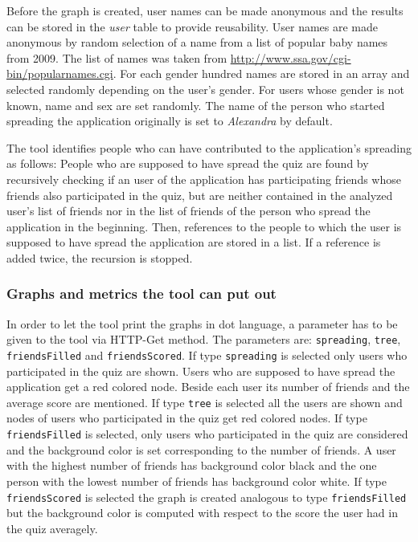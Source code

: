 \documentclass[preprint,12pt]{elsarticle}
\begin{document}
Before the graph is created, user names can be made anonymous and the
results can be stored in the \textit{user} table to provide
reusability. User names are made anonymous by random selection of
a name from a list of popular baby names from 2009. The list of names was
taken from \url{http://www.ssa.gov/cgi-bin/popularnames.cgi}.   
For each gender hundred names are stored in an array and selected
randomly depending on the user's gender. 
For users whose gender is not known, name and sex are set randomly. 
The name of the person who started spreading the application
originally is set to \textit{Alexandra} by default.

The tool identifies people who can have contributed to the
application's spreading as follows: People who are supposed to have
spread the quiz are found by recursively checking if an user of 
the application has participating friends whose friends also participated
in the quiz, but are neither contained in the analyzed user's list of
friends nor in the list of friends of the person
who spread the application in the beginning. Then, references to the
people to which the user is supposed to have spread the application
are stored in a list. If a reference is added twice, the recursion is stopped.

\subsubsection{Graphs and metrics the tool can put out}
\label{sec:graphs-metrics-tool}
In order to let the tool print the graphs in \ac{dot} language, a parameter
has to be given to the tool via HTTP-Get method. The parameters are:
\verb|spreading|, \verb|tree|, \verb|friendsFilled| and
\verb|friendsScored|. If type \verb|spreading| is selected only users
who participated in the quiz are shown. Users who are supposed to have
spread the application get a red colored node. Beside each user its number
of friends and the average score are mentioned. If
type \verb|tree| is 
selected all the users are shown and nodes of users who participated
in the quiz get red colored nodes. If type \verb|friendsFilled| is selected,
only users who participated in the quiz are considered and the
background color is set corresponding to the number of friends. A user
with the highest number of friends has background color black and the one
person with the lowest number of friends has background color
white. If type \verb|friendsScored| is selected the graph is created
analogous to type \verb|friendsFilled| but the background color is
computed with respect to the score the user had in the quiz averagely. 
\end{document}
